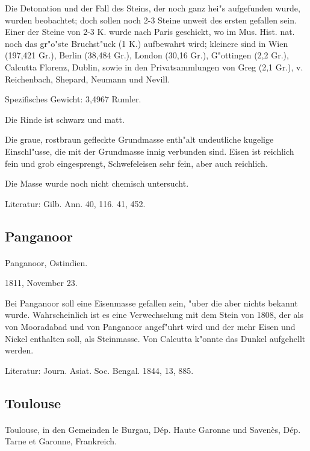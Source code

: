 \documentclass[a4paper, 11pt, oneside]{article}
\begin{document}
Die Detonation und der Fall des Steins, der noch ganz hei"s aufgefunden wurde, wurden beobachtet; doch sollen noch 2-3 Steine unweit des ersten gefallen sein. Einer der Steine von 2-3 K. wurde nach Paris geschickt, wo im Mus. Hist. nat. noch das gr"o"ste Bruchst"uck (1 K.) aufbewahrt wird; kleinere sind in Wien (197,421 Gr.), Berlin (38,484 Gr.), London (30,16 Gr.), G"ottingen (2,2 Gr.), Calcutta Florenz, Dublin, sowie in den Privatsammlungen von Greg (2,1 Gr.), v. Reichenbach, Shepard, Neumann und Nevill.

Spezifisches Gewicht: 3,4967 Rumler.

Die Rinde ist schwarz und matt.

Die graue, rostbraun gefleckte Grundmasse enth"alt undeutliche kugelige Einschl"usse, die mit der Grundmasse innig verbunden sind. Eisen ist reichlich fein und grob eingesprengt, Schwefeleisen sehr fein, aber auch reichlich.

Die Masse wurde noch nicht chemisch untersucht.

Literatur: Gilb. Ann. 40, 116. 41, 452.

\subsection{Panganoor}
\normalsize
\paragraph{}
Panganoor, Ostindien.

1811, November 23.

Bei Panganoor soll eine Eisenmasse gefallen sein, "uber die aber nichts bekannt wurde. Wahrscheinlich ist es eine Verwechselung mit dem Stein von 1808, der als von Mooradabad und von Panganoor angef"uhrt wird und der mehr Eisen und Nickel enthalten soll, als Steinmasse. Von Calcutta k"onnte das Dunkel aufgehellt werden.

Literatur: Journ. Asiat. Soc. Bengal. 1844, 13, 885.

\subsection{Toulouse}
\normalsize
\paragraph{}
Toulouse, in den Gemeinden le Burgau, Dép. Haute Garonne und Savenès, Dép. Tarne et Garonne, Frankreich.
\end{document}
